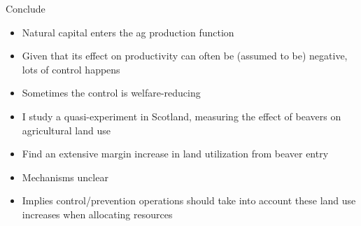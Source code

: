 Conclude

\begin{itemize}
    \item Natural capital enters the ag production function
    \item Given that its effect on productivity can often be (assumed to be) negative, lots of control happens
    \item Sometimes the control is welfare-reducing
    \item I study a quasi-experiment in Scotland, measuring the effect of beavers on agricultural land use
    \item Find an extensive margin increase in land utilization from beaver entry
    \item Mechanisms unclear
    \item Implies control/prevention operations should take into account these land use increases when allocating resources
\end{itemize}